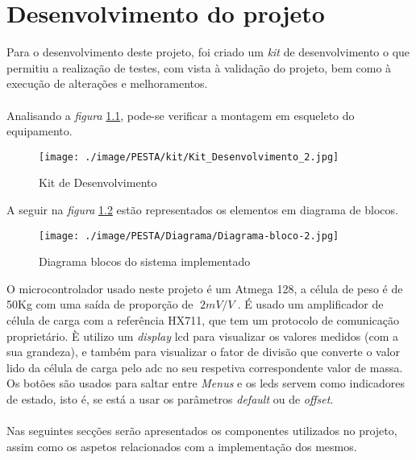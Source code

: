 \chapter{Desenvolvimento do projeto}
Para o desenvolvimento deste projeto, foi criado um \textit{kit} de desenvolvimento o que permitiu a realização de testes, com vista à validação do projeto, bem como à execução de alterações e melhoramentos.
\\
\\
Analisando a \textit{figura} \ref{Kit_Desenvolvimento_2}, pode-se verificar a montagem em esqueleto do equipamento.
\\
\begin{figure}[H]
	\centering
	\texttt{[image: ./image/PESTA/kit/Kit\_Desenvolvimento\_2.jpg]}
	\caption{Kit de Desenvolvimento}
	\label{Kit_Desenvolvimento_2}
\end{figure}
A seguir na \textit{figura} \ref{Diagrama-bloco-2} estão representados os elementos em diagrama de blocos.
\begin{figure}[H]
	\centering
	\texttt{[image: ./image/PESTA/Diagrama/Diagrama-bloco-2.jpg]}
	\caption{Diagrama blocos do sistema implementado}
	\label{Diagrama-bloco-2}
\end{figure}
O microcontrolador usado neste projeto é um Atmega 128, a célula de peso é de 50Kg com uma saída de proporção de $\; 2mV/V \;$. É usado um amplificador de célula de carga com a referência HX711, que tem um protocolo de comunicação proprietário.
È utilizo um \textit{display} \acs{lcd} para visualizar os valores medidos (com a sua grandeza), e também para visualizar o fator de divisão que converte o valor lido da célula de carga pelo \acs{adc} no seu respetiva correspondente valor de massa. Os
botões são usados para saltar entre \textit{Menus} e os \acsp{led} servem como indicadores de estado, isto é, se está a usar os parâmetros \textit{default} ou de \textit{offset}.
\\
\\
Nas seguintes secções serão apresentados os componentes utilizados no projeto, assim como os aspetos relacionados com a implementação dos mesmos.
